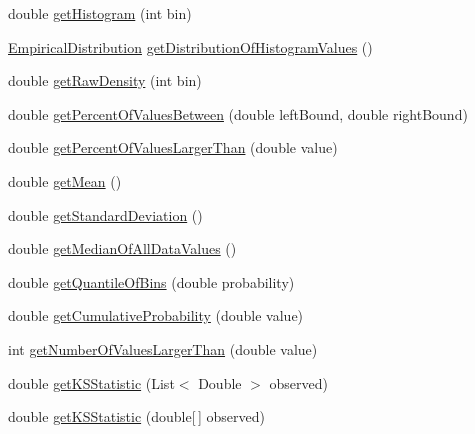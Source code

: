 \begin{DoxyCompactItemize}
double \hyperlink{classbroad_1_1core_1_1math_1_1_empirical_distribution_a5b21df6b2ce3df19d871ae0ebd1b9cec}{get\+Histogram} (int bin)
\item 
\hyperlink{classbroad_1_1core_1_1math_1_1_empirical_distribution}{Empirical\+Distribution} \hyperlink{classbroad_1_1core_1_1math_1_1_empirical_distribution_aab00bd3b82aa7048a17a57fc2f05191b}{get\+Distribution\+Of\+Histogram\+Values} ()
\item 
double \hyperlink{classbroad_1_1core_1_1math_1_1_empirical_distribution_a2cf0c99f0309dbc67192ddaa70bdaa1d}{get\+Raw\+Density} (int bin)
\item 
double \hyperlink{classbroad_1_1core_1_1math_1_1_empirical_distribution_a3c7586beedfa27952720655075a5e939}{get\+Percent\+Of\+Values\+Between} (double left\+Bound, double right\+Bound)
\item 
double \hyperlink{classbroad_1_1core_1_1math_1_1_empirical_distribution_a1b8be955520da05ba3b7a5074848fee2}{get\+Percent\+Of\+Values\+Larger\+Than} (double value)
\item 
double \hyperlink{classbroad_1_1core_1_1math_1_1_empirical_distribution_a095b4739b56efa19f731b64baa974b95}{get\+Mean} ()
\item 
double \hyperlink{classbroad_1_1core_1_1math_1_1_empirical_distribution_a0463b946ed45a8c92511ce684680e9bd}{get\+Standard\+Deviation} ()
\item 
double \hyperlink{classbroad_1_1core_1_1math_1_1_empirical_distribution_a4aecfe15a0ee52e7486cb2d63cc82648}{get\+Median\+Of\+All\+Data\+Values} ()
\item 
double \hyperlink{classbroad_1_1core_1_1math_1_1_empirical_distribution_aff802bd0118bab3ce71b97ab04f2e604}{get\+Quantile\+Of\+Bins} (double probability)
\item 
double \hyperlink{classbroad_1_1core_1_1math_1_1_empirical_distribution_acaf3ac4a00eb20b5fa99729d6050c98b}{get\+Cumulative\+Probability} (double value)
\item 
int \hyperlink{classbroad_1_1core_1_1math_1_1_empirical_distribution_ab66ebe060da4ef98cb0a57ef25180a81}{get\+Number\+Of\+Values\+Larger\+Than} (double value)
\item 
double \hyperlink{classbroad_1_1core_1_1math_1_1_empirical_distribution_ac265c5a5ca84aebb7d37229cbb92df34}{get\+K\+S\+Statistic} (List$<$ Double $>$ observed)
\item 
double \hyperlink{classbroad_1_1core_1_1math_1_1_empirical_distribution_a8af2c18c74eee6d28cd8e6778169260c}{get\+K\+S\+Statistic} (double\mbox{[}$\,$\mbox{]} observed)

\end{DoxyCompactItemize}

